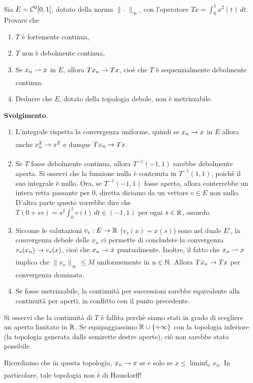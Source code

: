 \begin{exercise}
	Sia $E=\mathcal{C}^0[0,1]$, dotato della norma $\|\cdot\|_\infty$, con l'operatore $Tx = \int_0^1 x^2(t)\,dt$. Provare che
	\begin{enumerate}
		\item $T$ è fortemente continua,
		\item $T$ non è debolmente continua,
		\item Se $x_n \rightharpoonup x$ in $E$, allora $Tx_n \underset{{}}{\rightarrow} Tx$, cioè che $T$ è sequenzialmente debolmente continua.
		\item Dedurre che $E$, dotato della topologia debole, non è metrizzabile.
	\end{enumerate}

	\noindent\textbf{Svolgimento}.
	\begin{enumerate}
		\item L'integrale rispetta la convergenza uniforme, quindi se $x_n \underset{{}}{\rightarrow} x$ in $E$ allora anche $x^2_n \underset{{}}{\rightarrow} x^2$ e dunque $Tx_n \underset{{}}{\rightarrow} Tx$.
		\item Se $T$ fosse debolmente continua, allora $T^{-1}(-1,1)$ sarebbe debolmente aperta. Si osservi che la funzione nulla è contenuta in $T^{-1}(1,1)$, poichè il suo integrale è nullo. Ora, se $T^{-1}(-1,1)$ fosse aperto, allora conterrebbe un intera retta passante per $0$, diretta diciamo da un vettore $v \in E$ non nullo. D'altra parte questo vorrebbe dire che $T(0+sv) = s^2 \int_0^1 v(t)\,dt \in (-1,1)$ per ogni $s \in \mathbb{R}$, assurdo.
		\item Siccome le valutazioni $v_s : E \to \mathbb{R}$ ($v_s(x) = x(s)$) sono nel duale $E'$, la convergenza debole delle $x_n$ ci permette di concludere la convergenza $v_s(x_n) \underset{{}}{\rightarrow} v_s(x)$, cioè che $x_n \underset{{}}{\rightarrow} x$ puntualmente. Inoltre, il fatto che $x_n \rightharpoonup x$ implica che $\|x_n\|_\infty \leq M$ uniformemente in $n \in \mathbb{N}$.  Allora $Tx_n \underset{{}}{\rightarrow} Tx$ per convergenza dominata.
		\item Se fosse metrizzabile, la continuità per successioni sarebbe equivalente alla continuità per aperti, in conflitto con il punto precedente.
	\end{enumerate}
\end{exercise}

Si osservi che la continuità di $T$ è fallita perchè siamo stati in grado di scegliere un aperto limitato in $\mathbb{R}$. Se equipaggiassimo $\mathbb{R} \cup \{+\infty\}$ con la topologia inferiore (la topologia generata dalle semirette destre aperte), ciò non sarebbe stato possibile.

Ricordiamo che in questa topologia, $x_n \underset{{}}{\rightarrow} x$ se e solo se $x \leq \liminf_n x_n$. In particolare, tale topologia non è di Hausdorff!

